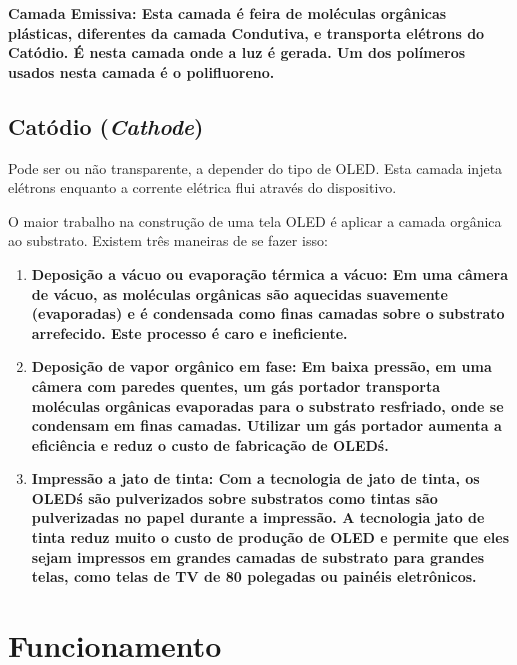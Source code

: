 \bf{Camada Emissiva:} Esta camada é feira de moléculas orgânicas plásticas, diferentes da camada Condutiva, e transporta elétrons do Catódio. É nesta camada onde a luz é gerada. Um dos polímeros usados nesta camada é o polifluoreno. 


\subsection{Catódio (\textit{Cathode})}
\label{sec:substrato}

Pode ser ou não transparente, a depender do tipo de OLED. Esta camada injeta elétrons enquanto a corrente elétrica flui através do dispositivo. 

O maior trabalho na construção de uma tela OLED é aplicar a camada orgânica ao substrato. Existem três maneiras de se fazer isso:

\begin{enumerate}
	\item \bf{Deposição a vácuo ou evaporação térmica a vácuo:} Em uma câmera de vácuo, as moléculas orgânicas são aquecidas suavemente (evaporadas) e é condensada como finas camadas sobre o substrato arrefecido. Este processo é caro e ineficiente.

	\item \bf{Deposição de vapor orgânico em fase:} Em baixa pressão, em uma câmera com paredes quentes, um gás portador transporta moléculas orgânicas evaporadas para o substrato resfriado, onde se condensam em finas camadas. Utilizar um gás portador aumenta a eficiência e reduz o custo de fabricação de OLED\'s.

	\item \bf{Impressão a jato de tinta:} Com a tecnologia de jato de tinta, os OLED\'s são pulverizados sobre substratos como tintas são pulverizadas no papel durante a impressão. A tecnologia jato de tinta reduz muito o custo de produção de OLED e permite que eles sejam impressos em grandes camadas de substrato para grandes telas, como telas de TV de 80 polegadas ou painéis eletrônicos.
\end{enumerate}


\section{Funcionamento}
\label{sec:funcionamento}

